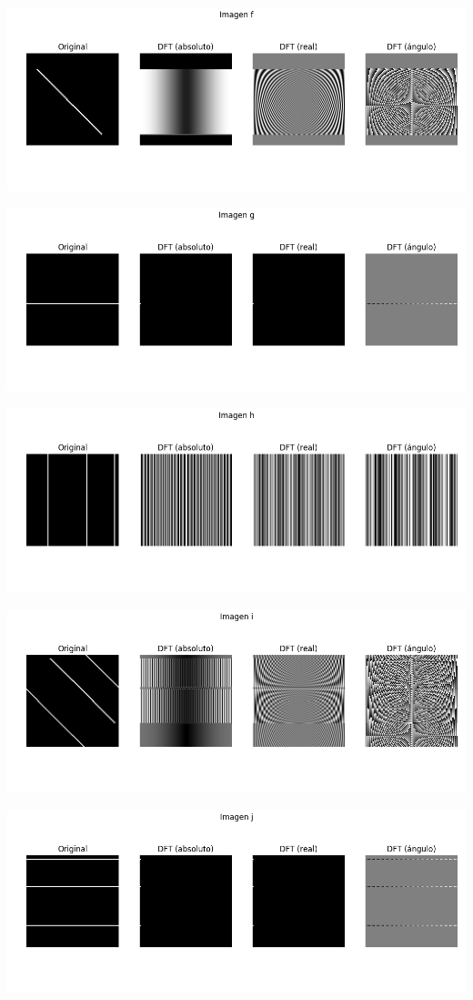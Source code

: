 \documentclass[a4paper]{article}
\begin{document}
\begin{center}
\includegraphics[scale=0.4]{imgs/3-f.png}

\includegraphics[scale=0.4]{imgs/3-g.png}

\includegraphics[scale=0.4]{imgs/3-h.png}

\includegraphics[scale=0.4]{imgs/3-i.png}

\includegraphics[scale=0.4]{imgs/3-j.png}
\end{center}
\end{document}
